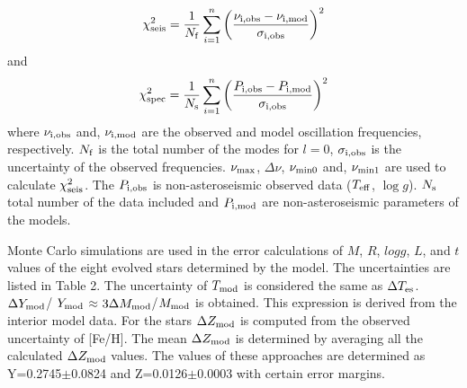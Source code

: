 \documentclass[a4paper,fleqn,usenatbib]{mnras}     %
\begin{document}
{\begin{equation}
{\chi^2_{\rm seis}}= \frac{1}{N_{\rm f}}\sum\limits_{i=1}^n\left(\frac{{\nu_{\rm i,obs}}-{\nu_{\rm i,mod}}}{\sigma_{\rm i,obs}}\right)^2
\end{equation}
and
\begin{equation}
{\chi^2_{\rm spec}}= \frac{1}{N_{\rm s}}\sum\limits_{i=1}^n\left(\frac{{P_{\rm i,obs}}-{P_{\rm i,mod}}}{\sigma_{\rm i,obs}}\right)^2
\end{equation}
where ${\nu_{\rm i,obs}}$ and, ${\nu_{\rm i,mod}}$ are the observed and model oscillation frequencies, respectively.
${N_{\rm f}}$ is the total number of the modes for $l=0$, ${\sigma_{\rm i,obs}}$ is
the  uncertainty of the observed frequencies.
${\nu_{\rm max}}$, ${\Delta\nu}$,
${\nu_{\rm min0}}$ and, ${\nu_{\rm min1}}$
 are used to calculate ${{\chi^2_{\rm seis}}}$.
The ${P_{\rm i,obs}}$ is
non-asteroseismic observed data 
(${T_{\rm eff}}$, $\log g$). 
${N_{\rm s}}$ total number of the data included
and ${P_{\rm i,mod}}$ are non-asteroseismic parameters of the models.

Monte Carlo simulations are used 
in the error calculations of $M$, $R$, $logg$, 
$L$, and $t$ values of the 
eight evolved stars determined by the model.
The uncertainties are listed in Table 2.
The uncertainty of ${T_{\rm mod}}$ is considered the same as ${\Delta T_{\rm es}}$.
 ${\Delta Y_{\rm mod}}$/ ${Y_{\rm mod}}$$\approx$$3{\Delta M_{\rm mod}}$/${M_{\rm mod}}$ is obtained. This expression is
derived from the interior model data. 
For the stars ${\Delta Z_{\rm mod}}$ is computed from the observed uncertainty of [Fe/H].
The mean ${\Delta Z_{\rm mod}}$ 
is determined by averaging all the 
calculated ${\Delta Z_{\rm mod}}$ values.
The values of these approaches
 are determined as Y=0.2745$\pm$0.0824 and Z=0.0126$\pm$0.0003 
with certain error margins.

}
\end{document}
